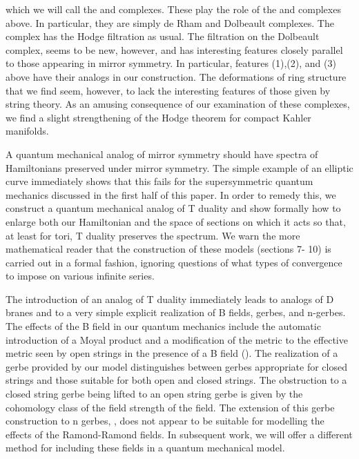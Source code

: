 \documentclass[a4paper,11pt]{amsart}
\begin{document}
which we will call the \coordHE{} and \coordHE{} complexes. These play the role of the 
\coordHE{} and \coordHE{} complexes above. In particular, they are simply de Rham and 
Dolbeault complexes. The \coordHE{} complex has the Hodge filtration as usual. The 
filtration on the Dolbeault complex, seems to be new, however, and has 
interesting features closely parallel to those appearing in mirror
symmetry. In particular, features (1),(2), and (3) above have their analogs in
our construction. The deformations of ring structure that we find seem, however, to lack 
the interesting features of those given by string theory. As an amusing 
consequence of our examination of these complexes, we find a slight
strengthening of the Hodge theorem for compact Kahler manifolds. 

A quantum mechanical analog of mirror symmetry should have spectra of
Hamiltonians preserved under mirror symmetry. The simple example of an
elliptic curve immediately shows that this fails for the supersymmetric quantum 
mechanics discussed in the first half of this paper. In order to remedy this, 
we construct a quantum mechanical analog of T duality and show formally how to
 enlarge both our Hamiltonian 
and the space of sections on which it acts so that, at least for tori, 
T duality preserves the spectrum. We warn the more mathematical reader that 
the construction of these models (sections 7- 10) is carried
out in a formal fashion, ignoring questions of what types of convergence to
impose on various infinite series. 

  The introduction of an analog of T duality immediately leads to analogs of D
  branes and to a very simple explicit realization of B fields, gerbes, and
  n-gerbes. The effects of the B field in our quantum mechanics include the 
  automatic introduction of a Moyal product and a modification of the metric 
to the effective metric seen by open strings in the presence of a B
 field (\cite{SW}). The realization of a gerbe provided by our model
 distinguishes between gerbes appropriate for closed strings and those suitable
 for both open and closed strings. The obstruction to a closed string gerbe 
 being lifted to an open string gerbe is given by the cohomology class of the
 field strength of the \coordHE{} field.
 The extension of this gerbe construction to n gerbes, \coordHE{}, does not appear
  to be suitable for modelling the effects of the Ramond-Ramond fields. In 
   subsequent work, we will offer a different method for including
    these fields in a quantum mechanical model.  
\end{document}
